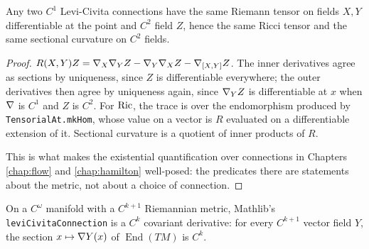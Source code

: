 \begin{theorem}
  \label{thm:ricci-well-defined}
  \leanok
  Any two $C^1$ Levi-Civita connections have the same Riemann tensor on fields
  $X, Y$ differentiable at the point and $C^2$ field $Z$, hence the same Ricci
  tensor and the same sectional curvature on $C^2$ fields.
\end{theorem}

\begin{proof}
  \leanok
  $R(X,Y)Z = \nabla_X \nabla_Y Z - \nabla_Y \nabla_X Z - \nabla_{[X,Y]} Z$. The inner
  derivatives agree as sections by uniqueness, since $Z$ is differentiable
  everywhere; the outer derivatives then agree by uniqueness again, since
  $\nabla_Y Z$ is differentiable at $x$ when $\nabla$ is $C^1$ and $Z$ is $C^2$.
  For $\operatorname{Ric}$, the trace is over the endomorphism produced by
  \texttt{TensorialAt.mkHom}, whose value on a vector is $R$ evaluated on a
  differentiable extension of it. Sectional curvature is a quotient of inner
  products of $R$.

  This is what makes the existential quantification over connections in
  Chapters \ref{chap:flow} and \ref{chap:hamilton} well-posed: the
  predicates there are statements about the metric, not about a choice of
  connection.
\end{proof}

\begin{theorem}
  \label{thm:levi-civita-smooth}
  \leanok
  On a $C^\omega$ manifold with a $C^{k+1}$ Riemannian metric, Mathlib's
  \texttt{leviCivitaConnection} is a $C^k$ covariant derivative: for every
  $C^{k+1}$ vector field $Y$, the section $x \mapsto \nabla Y(x)$ of
  $\operatorname{End}(TM)$ is $C^k$.
\end{theorem}

